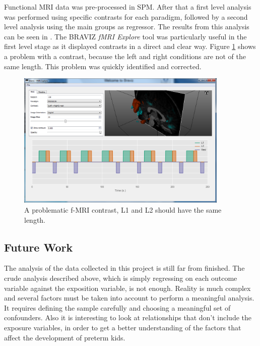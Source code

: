 Functional MRI data was pre-processed in SPM.  After that a first level analysis was performed using specific contrasts for each paradigm, followed by a second level analysis using the main groups as regressor. The results from this analysis can be seen in \autocite{uriza_reporte_2015}. The BRAVIZ \emph{fMRI Explore} tool was particularly useful in the first level stage as it displayed contrasts in a direct and clear way. Figure \ref{fig_spm_contrast_error} shows a problem with a contrast, because the left and right conditions are not of the same length. This problem was quickly identified and corrected.

\begin{figure}
	\centering
		\includegraphics[width=0.9\textwidth]{figures/kmc400/erroro_fmri2}
	\caption{A problematic f-MRI contrast, L1 and L2 should have the same length.}
	\label{fig_spm_contrast_error}
\end{figure}
 

\subsection{Future Work}

The analysis of the data collected in this project is still far from finished. The crude analysis described above, which is simply regressing on each outcome variable against the exposition variable, is not enough. Reality is much complex and several factors must be taken into account to perform a meaningful analysis. It requires defining the sample carefully and choosing a meaningful set of confounders. Also it is interesting to look at relationships that don't include the exposure variables, in order to get a better understanding of the factors that affect the development of preterm kids. 

